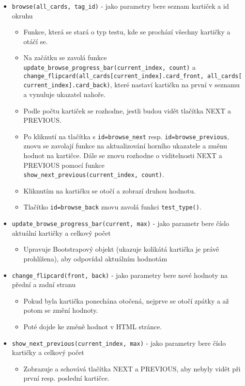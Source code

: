 \documentclass[11pt]{article}
\providecommand{\tightlist}{\setlength{\itemsep}{1pt}\setlength{\parskip}{1pt}}
\let\oldtexttt\texttt
\renewcommand{\texttt}[1]{\oldtexttt{\textcolor{codehighlight}{#1}}}
\begin{document}
\begin{itemize}
\tightlist
\item
  \texttt{browse(all\_cards,\ tag\_id)} - jako parametry bere seznam
  kartiček a id okruhu

  \begin{itemize}
  \tightlist
  \item
    Funkce, která se stará o typ testu, kde se prochází všechny kartičky
    a otáčí se.
  \item
    Na začátku se zavolá funkce
    \texttt{update\_browse\_progress\_bar(current\_index,\ count)} a
    \texttt{change\_flipcard(all\_cards{[}current\_index{]}.card\_front,\ all\_cards{[}current\_index{]}.card\_back)},
    které nastaví kartičku na první v seznamu a vynuluje ukazatel
    nahoře.
  \item
    Podle počtu kartiček se rozhodne, jestli budou vidět tlačítka NEXT a
    PREVIOUS.
  \item
    Po kliknutí na tlačítka s \texttt{id=browse\_next} resp.
    \texttt{id=browse\_previous}, znovu se zavolají funkce na
    aktualizování horního ukazatele a změnu hodnot na kartičce. Dále se
    znovu rozhodne o viditelnosti NEXT a PREVIOUS pomocí funkce
    \texttt{show\_next\_previous(current\_index,\ count)}.
  \item
    Kliknutím na kartičku se otočí a zobrazí druhou hodnotu.
  \item
    Tlačítko \texttt{id=browse\_back} znovu zavolá funkci
    \texttt{test\_type()}.
  \end{itemize}
\item
  \texttt{update\_browse\_progress\_bar(current,\ max)} - jako parametr
  bere číslo aktuální kartičky a celkový počet

  \begin{itemize}
  \tightlist
  \item
    Upravuje Bootstrapový objekt (ukazuje kolikátá kartička je právě
    prohlížena), aby odpovídal aktuálním hodnotám
  \end{itemize}
\item
  \texttt{change\_flipcard(front,\ back)} - jako parametry bere nové
  hodnoty na přední a zadní stranu

  \begin{itemize}
  \tightlist
  \item
    Pokud byla kartička ponechána otočená, nejprve se otočí zpátky a až
    potom se změní hodnoty.
  \item
    Poté dojde ke změně hodnot v HTML stránce.
  \end{itemize}
\item
  \texttt{show\_next\_previous(current\_index,\ max)} - jako parametry
  bere číslo kartičky a celkový počet

  \begin{itemize}
  \tightlist
  \item
    Zobrazuje a schovává tlačítka NEXT a PREVIOUS, aby nebyly vidět při
    první resp. poslední kartičce.
  \end{itemize}
\end{itemize}
\end{document}
